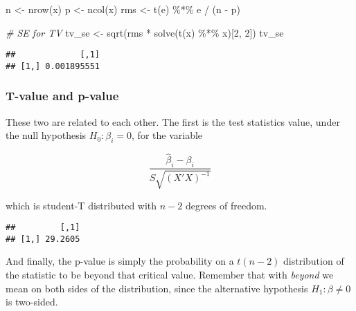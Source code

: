 \documentclass[
  oneside]{book}
\newenvironment{Shaded}{\begin{snugshade}}{\end{snugshade}}
\newcommand{\CommentTok}[1]{\textcolor[rgb]{0.56,0.35,0.01}{\textit{#1}}}
\newcommand{\DecValTok}[1]{\textcolor[rgb]{0.00,0.00,0.81}{#1}}
\newcommand{\FunctionTok}[1]{\textcolor[rgb]{0.00,0.00,0.00}{#1}}
\newcommand{\NormalTok}[1]{#1}
\newcommand{\OtherTok}[1]{\textcolor[rgb]{0.56,0.35,0.01}{#1}}
\newcommand{\SpecialCharTok}[1]{\textcolor[rgb]{0.00,0.00,0.00}{#1}}
\begin{document}
\begin{Shaded}
\begin{Highlighting}[]
\NormalTok{n }\OtherTok{\textless{}{-}} \FunctionTok{nrow}\NormalTok{(x)}
\NormalTok{p }\OtherTok{\textless{}{-}} \FunctionTok{ncol}\NormalTok{(x)}
\NormalTok{rms }\OtherTok{\textless{}{-}} \FunctionTok{t}\NormalTok{(e) }\SpecialCharTok{\%*\%}\NormalTok{ e }\SpecialCharTok{/}\NormalTok{ (n }\SpecialCharTok{{-}}\NormalTok{ p)}

\CommentTok{\# SE for TV}
\NormalTok{tv\_se }\OtherTok{\textless{}{-}} \FunctionTok{sqrt}\NormalTok{(rms }\SpecialCharTok{*} \FunctionTok{solve}\NormalTok{(}\FunctionTok{t}\NormalTok{(x) }\SpecialCharTok{\%*\%}\NormalTok{ x)[}\DecValTok{2}\NormalTok{, }\DecValTok{2}\NormalTok{])}
\NormalTok{tv\_se}
\end{Highlighting}
\end{Shaded}

\begin{verbatim}
##             [,1]
## [1,] 0.001895551
\end{verbatim}

\hypertarget{t-value-and-p-value}{%
\subsubsection{T-value and p-value}\label{t-value-and-p-value}}

These two are related to each other. The first is the
test statistics value, under the null hypothesis
\(H_0 : \beta_i = 0\), for the variable

\[
\frac{\hat\beta_i - \beta_i}{S \sqrt{(X'X)^{-1}}}
\]

which is student-T distributed with \(n-2\) degrees of freedom.

\begin{Shaded}
\end{Shaded}

\begin{verbatim}
##         [,1]
## [1,] 29.2605
\end{verbatim}

And finally, the p-value is simply the probability
on a \(t(n-2)\) distribution of the statistic to be
beyond that critical value. Remember that with \emph{beyond}
we mean on both sides of the distribution, since the
alternative hypothesis \(H_1: \beta \neq 0\) is two-sided.
\end{document}
